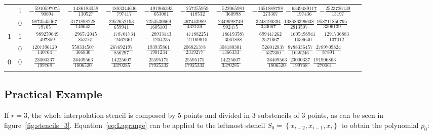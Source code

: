 \begin{table}
\begin{center}
\begin{tabular}{cccccccccc}
           &  $1$  &  $-\frac{  5910597075}{  90694}$  &  $-\frac{  1486183058}{ 130527}$  &  $-\frac{ 1883344606}{  797417}$  &  $-\frac{ 491966393}{  653081}$  &  $-\frac{ 257255959}{  418532}$  &  $-\frac{ 522065981}{  360998}$  &  $-\frac{ 1651888798}{  273307}$  $-\frac{  6349489117}{ 197436}$  $-\frac{  2523726139}{  13197}$  \\ \addlinespace
           &  $0$  &  $ \frac{  9873545067}{  79705}$  &  $ \frac{  3171898228}{ 146643}$  &  $ \frac{ 2952652193}{  659941}$  &  $ \frac{2253530669}{ 1605103}$  &  $ \frac{ 467443989}{  432139}$  &  $ \frac{2349998749}{  992475}$  &  $ \frac{ 3248190394}{  343067}$  $ \frac{138686396638}{2813507}$  $ \frac{958711850795}{3306139}$  \\ \addlinespace
      $1$  &  $1$  &  $-\frac{   989259649}{ 497859}$  &  $-\frac{   296572045}{ 853161}$  &  $-\frac{  178701734}{ 2462661}$  &  $-\frac{  28933143}{ 1204235}$  &  $-\frac{ 471882251}{21169910}$  &  $-\frac{ 186193587}{ 3061888}$  &  $-\frac{  699447262}{ 2521667}$  $-\frac{  1605498941}{1038640}$  $-\frac{  1291706883}{ 137012}$  \\ \addlinespace
           &  $0$  &  $ \frac{  1207396129}{ 140764}$  &  $ \frac{   550334507}{ 366830}$  &  $ \frac{  267692197}{  856297}$  &  $ \frac{ 193935861}{ 1901234}$  &  $ \frac{ 206821378}{ 2319277}$  &  $ \frac{ 308180301}{ 1366333}$  &  $ \frac{  526012837}{  537300}$  $ \frac{  8788336457}{1659246}$  $ \frac{  2789709824}{  87891}$  \\ \addlinespace
      $0$  &  $0$  &  $ \frac{    23000337}{ 199768}$  &  $ \frac{    36409563}{1806520}$  &  $ \frac{   14225607}{ 3370285}$  &  $ \frac{  25595175}{17925332}$  &  $ \frac{  25595175}{17925332}$  &  $ \frac{  14225607}{ 3370285}$  &  $ \frac{   36409563}{ 1806520}$  $ \frac{    23000337}{ 199768}$  $ \frac{   191906863}{ 270061}$  \\ \addlinespace
      \bottomrule
    \end{tabular}
  \end{center}
\end{table}

\subsection{Practical Example}

If $r=3$, the whole interpolation stencil is composed by \num{5} points and divided in \num{3} substencils of \num{3} points, as can be seen in figure~\ref{fig:stencils_3}. Equation~\eqref{eq:Lagrange} can be applied to the leftmost stencil $S_0=\left\{ x_{i-2}, x_{i-1}, x_i \right\}$ to obtain the polynomial $p_0$:

